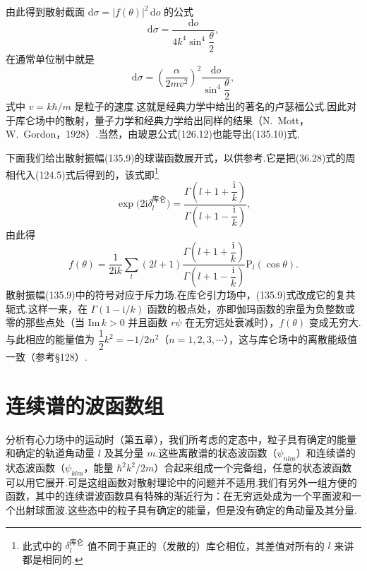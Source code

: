 由此得到散射截面 $\mathrm{d}\sigma=|f(\theta)|^2\,\mathrm{d}o$ 的公式
\begin{equation*}
  \mathrm{d}\sigma=\frac{\mathrm{d}o}{4k^4\sin^4\dfrac{\theta}{2}},
\end{equation*}
在通常单位制中就是
\begin{equation}
  \mathrm{d}\sigma=\left(\frac{\alpha}{2mv^2}\right)^{2}
  \frac{\mathrm{d}o}{\sin^4\dfrac{\theta}{2}},
\end{equation}
式中 $v=k\hbar/m$ 是粒子的速度.这就是经典力学中给出的著名的卢瑟福公式.因此对于库仑场中的散射，量子力学和经典力学给出同样的结果（N.~Mott，W.~Gordon，1928）.当然，由玻恩公式(126.12)也能导出(135.10)式.

下面我们给出散射振幅(135.9)的球谐函数展开式，以供参考.它是把(36.28)式的周相代入(124.5)式后得到的，该式即\footnote{此式中的 $\delta_l^{\text{库仑}}$ 值不同于真正的（发散的）库仑相位，其差值对所有的 $l$ 来讲都是相同的.}
\begin{equation}
  \exp\bigl(2\mathrm{i}\delta_l^{\text{库仑}}\bigr)
  =\frac{\Gamma\left(l+1+\dfrac{\mathrm{i}}{k}\right)}
  {\Gamma\left(l+1-\dfrac{\mathrm{i}}{k}\right)},
\end{equation}
由此得
\begin{equation}
  f(\theta)=\frac{1}{2\mathrm{i}k}\sum_l(2l+1)
  \frac{\Gamma\left(l+1+\dfrac{\mathrm{i}}{k}\right)}
  {\Gamma\left(l+1-\dfrac{\mathrm{i}}{k}\right)}
  \mathrm{P}_l(\cos\theta).
\end{equation}
散射振幅(135.9)中的符号对应于斥力场.在库仑引力场中，(135.9)式改成它的复共轭式.这样一来，在 $\Gamma(1-\mathrm{i}/k)$ 函数的极点处，亦即伽玛函数的宗量为负整数或零的那些点处（当 $\mathrm{Im}\,k>0$ 并且函数 $r\psi$ 在无穷远处衰减时），$f(\theta)$ 变成无穷大.与此相应的能量值为
$\dfrac{1}{2}k^2=-1/2n^2$（$n=1,2,3,\cdots$），这与库仑场中的离散能级值一致（参考§128）.

\section{连续谱的波函数组}

分析有心力场中的运动时（第五章），我们所考虑的定态中，粒子具有确定的能量和确定的轨道角动量 $l$ 及其分量 $m$.这些离散谱的状态波函数（$\psi_{nlm}$）和连续谱的状态波函数（$\psi_{klm}$，能量 $\hbar^2k^2/2m$）合起来组成一个完备组，任意的状态波函数可以用它展开.可是这组函数对散射理论中的问题并不适用.我们有另外一组方便的函数，其中的连续谱波函数具有特殊的渐近行为：在无穷远处成为一个平面波和一个出射球面波.这些态中的粒子具有确定的能量，但是没有确定的角动量及其分量.

